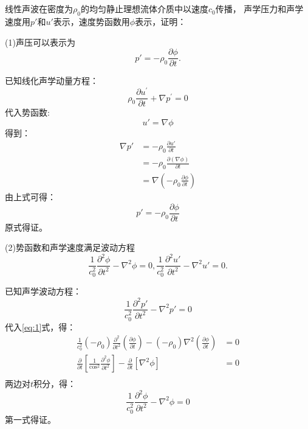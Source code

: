 \subsection*{}
\vskip -1cm
线性声波在密度为$\rho_0$的均匀静止理想流体介质中以速度$c_0$传播，
声学压力和声学速度用$p'$和$u'$表示，速度势函数用$\phi$表示，证明：

\noindent (1)声压可以表示为$$ p'=-\rho_0 \frac{\partial{\phi}}{\partial{t}} . $$

\noindent 已知线化声学动量方程：
\begin{equation}
    \rho_{0} \frac{\partial u^{\prime}}{\partial t}+\nabla p^{\prime}=0
\end{equation}
代入势函数:
\begin{equation}
    u'=\nabla \phi
    \label{eq:0}
\end{equation}
得到：
\begin{equation}
    \begin{aligned}
        \nabla p' &= - \rho_0 \frac{\partial u' }{\partial t} \\
                  &= - \rho_0 \frac{\partial (\nabla \phi) }{\partial t} \\
                  &= \nabla (- \rho_0 \frac{\partial \phi}{\partial t})
    \end{aligned}
\end{equation}
由上式可得：
\begin{equation}
    p' = -\rho_0 \frac{\partial{\phi}}{\partial{t}}
    \label{eq:1}
\end{equation}
原式得证。

\noindent (2)势函数和声学速度满足波动方程
$$\frac{1}{c_{0}^{2}} \frac{\partial^{2} \phi}{\partial t^{2}}-\nabla^{2} \phi=0,\frac{1}{c_{0}^{2}} \frac{\partial^{2} u'}{\partial t^{2}}-\nabla^{2} u'=0.$$

\noindent 已知声学波动方程：
\begin{equation}
    \frac{1}{c_{0}^{2}} \frac{\partial^{2} p'}{\partial t^{2}}-\nabla^{2} p'=0
\end{equation}
代入\eqref{eq:1}式，得：
\begin{equation}
    \begin{aligned}
        \frac{1}{c_{0}^{2}}\left(-\rho_{0}\right) \frac{\partial^{2}}{\partial t^{2}}\left(\frac{\partial \phi}{\partial t}\right)
        -\left(-\rho_{0}\right) \nabla^{2} (\frac{\partial \phi}{\partial t}) &= 0 \\
        \frac{\partial}{\partial t}\left[\frac{1}{\cos ^{2}} \frac{\partial^{2} \phi}{\partial t^{2}}\right]-
        \frac{\partial}{\partial t}\left[\nabla^{2} \phi\right] &= 0 \\
    \end{aligned}
\end{equation}
两边对$t$积分，得：
\begin{equation}
    \frac{1}{c_{0}^{2}} \frac{\partial^{2} \phi}{\partial t^{2}}-\nabla^{2} \phi=0
    \label{eq:2}
\end{equation}
第一式得证。

